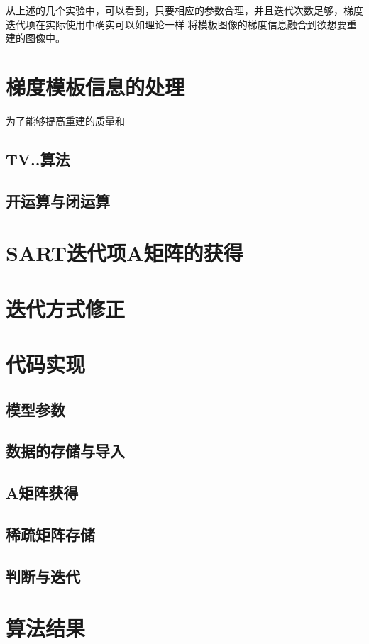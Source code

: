 从上述的几个实验中，可以看到，只要相应的参数合理，并且迭代次数足够，梯度迭代项在实际使用中确实可以如理论一样
将模板图像的梯度信息融合到欲想要重建的图像中。

\section{梯度模板信息的处理}
为了能够提高重建的质量和
\subsection{TV..算法}
\subsection{开运算与闭运算}

\section{SART迭代项A矩阵的获得}

\section{迭代方式修正}

\section{代码实现}
\subsection{模型参数}
\subsection{数据的存储与导入}
\subsection{A矩阵获得}
\subsection{稀疏矩阵存储}
\subsection{判断与迭代}
\section{算法结果}





